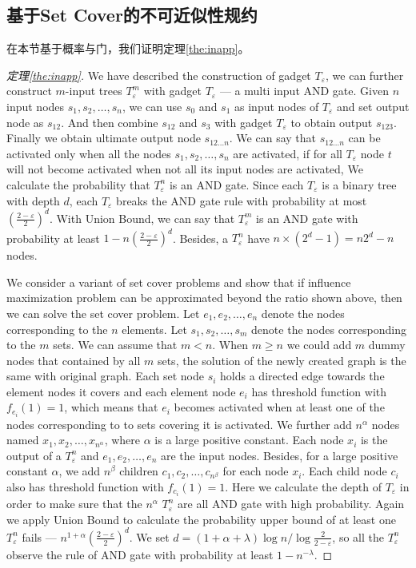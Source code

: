 \subsection{基于Set Cover的不可近似性规约}
在本节基于概率与门，我们证明定理\ref{the:inapp}。
\begin{proof}[定理\ref{the:inapp}]
We have described the construction of gadget $T_\varepsilon$, we can further construct $m$-input trees
$T_\varepsilon^m$ with gadget $T_\varepsilon$ --- a multi input AND gate.
Given $n$ input nodes $s_1, s_2, \dots, s_n$,
we can use $s_0$ and $s_1$ as input nodes of $T_\varepsilon$ and set output node as $s_{12}$.
And then combine $s_{12}$ and $s_{3}$ with gadget $T_\varepsilon$ to obtain output $s_{123}$.
Finally we obtain ultimate output node $s_{12\dots n}$.
We can say that $s_{12\dots n}$ can be activated only when all the nodes $s_1, s_2, \dots, s_n$ are activated,
if for all $T_\varepsilon$ node $t$ will not become activated when not all its input nodes are activated,
We calculate the probability that $T_\varepsilon^n$ is an AND gate.
Since each $T_\varepsilon$ is a binary tree with depth $d$,
each $T_\varepsilon$ breaks the AND gate rule with probability at most $(\frac{2-\varepsilon}{2})^{d}$.
With Union Bound, we can say that $T_\varepsilon^m$ is an AND gate with probability at least $1-n(\frac{2-\varepsilon}{2})^{d}$.
Besides, a $T_\varepsilon^n$ have $n\times(2^d-1) = n2^d-n$ nodes.

We consider a variant of set cover problems and show that if influence maximization problem can be approximated beyond the ratio shown above,
then we can solve the set cover problem.
Let $e_1, e_2, \dots, e_n$ denote the nodes corresponding to the $n$ elements.
Let $s_1, s_2, \dots, s_m$ denote the nodes corresponding to the $m$ sets.
We can assume that $m<n$.
When $m\geq n$ we could add $m$ dummy nodes that contained by all $m$ sets,
the solution of the newly created graph is the same with original graph.
Each set node $s_i$ holds a directed edge towards the element nodes it covers
and each element node $e_i$ has threshold function with $f_{e_i}(1)=1$,
which means that $e_i$ becomes activated when at least one of the nodes corresponding to to sets covering it is activated.
We further add $n^\alpha$ nodes named $x_1, x_2, \dots, x_{n^\alpha}$, where $\alpha$ is a large positive constant.
Each node $x_i$ is the output of a $T_\varepsilon^n$ and $e_1, e_2, \dots, e_n$ are the input nodes.
Besides, for a large positive constant $\alpha$,
we add $n^\beta$ children $c_1, c_2, \dots, c_{n^\beta}$ for each node $x_i$.
Each child node $c_i$ also has threshold function with $f_{c_i}(1)=1$.
Here we calculate the depth of $T_\varepsilon$ in order to make sure that the $n^\alpha$ $T_\varepsilon^n$ are all AND gate with high probability.
Again we apply Union Bound to calculate the probability upper bound of at least one $T_\varepsilon^n$ fails
--- $n^{1+\alpha}(\frac{2-\varepsilon}{2})^{d}$.
We set $d = (1+\alpha+\lambda)\log n / \log{\frac{2}{2-\varepsilon}}$,
so all the $T_\varepsilon^n$ observe the rule of AND gate with probability at least $1-n^{-\lambda}$.


\end{proof}
